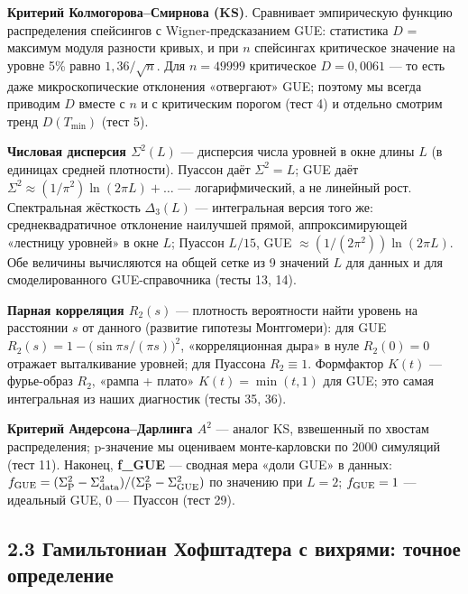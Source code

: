 \documentclass[
]{article}
\begin{document}
\textbf{Критерий Колмогорова--Смирнова (KS)}. Сравнивает эмпирическую
функцию распределения спейсингов с Wigner-предсказанием GUE: статистика
\(D\) = максимум модуля разности кривых, и при \(n\) спейсингах
критическое значение на уровне 5\% равно \(1{,}36/\sqrt{n}\). Для
\(n=49999\) критическое \(D = 0{,}0061\) --- то есть даже
микроскопические отклонения «отвергают» GUE; поэтому мы всегда приводим
\(D\) вместе с \(n\) и с критическим порогом (тест 4) и отдельно смотрим
тренд \(D(T_{\min})\) (тест 5).

\textbf{Числовая дисперсия \(\Sigma^2(L)\)} --- дисперсия числа уровней
в окне длины \(L\) (в единицах средней плотности). Пуассон даёт
\(\Sigma^2 = L\); GUE даёт
\(\Sigma^2 \approx (1/\pi^2)\ln(2\pi L) + \ldots\) --- логарифмический,
а не линейный рост. Спектральная жёсткость \(\Delta_3(L)\) ---
интегральная версия того же: среднеквадратичное отклонение наилучшей
прямой, аппроксимирующей «лестницу уровней» в окне \(L\); Пуассон
\(L/15\), GUE \(\approx (1/(2\pi^2))\ln(2\pi L)\). Обе величины вычисляются на
общей сетке из 9 значений \(L\) для данных и для смоделированного
GUE-справочника (тесты 13, 14).

\textbf{Парная корреляция \(R_2(s)\)} --- плотность вероятности найти
уровень на расстоянии \(s\) от данного (развитие гипотезы Монтгомери):
для GUE \(R_2(s) = 1 - \bigl(\sin \pi s/(\pi s)\bigr)^2\),
«корреляционная дыра» в нуле \(R_2(0)=0\) отражает выталкивание уровней;
для Пуассона \(R_2 \equiv 1\). Формфактор \(K(t)\) --- фурье-образ
\(R_2\), «рампа + плато» \(K(t)=\min(t,1)\) для GUE; это самая
интегральная из наших диагностик (тесты 35, 36).

\textbf{Критерий Андерсона--Дарлинга \(A^2\)} --- аналог KS, взвешенный
по хвостам распределения; p-значение мы оцениваем монте-карловски по
2000 симуляций (тест 11). Наконец, \textbf{f\_GUE} --- сводная мера
«доли GUE» в данных:
\(f_{\rm GUE} = (\Sigma^2_{\rm P} - \Sigma^2_{\rm data})/(\Sigma^2_{\rm P} - \Sigma^2_{\rm GUE})\)
по значению при \(L=2\); \(f_{\rm GUE}=1\) --- идеальный GUE, \(0\) ---
Пуассон (тест 29).

\subsection{2.3 Гамильтониан Хофштадтера с вихрями: точное
определение}\label{ux433ux430ux43cux438ux43bux44cux442ux43eux43dux438ux430ux43d-ux445ux43eux444ux448ux442ux430ux434ux442ux435ux440ux430-ux441-ux432ux438ux445ux440ux44fux43cux438-ux442ux43eux447ux43dux43eux435-ux43eux43fux440ux435ux434ux435ux43bux435ux43dux438ux435}
\end{document}
